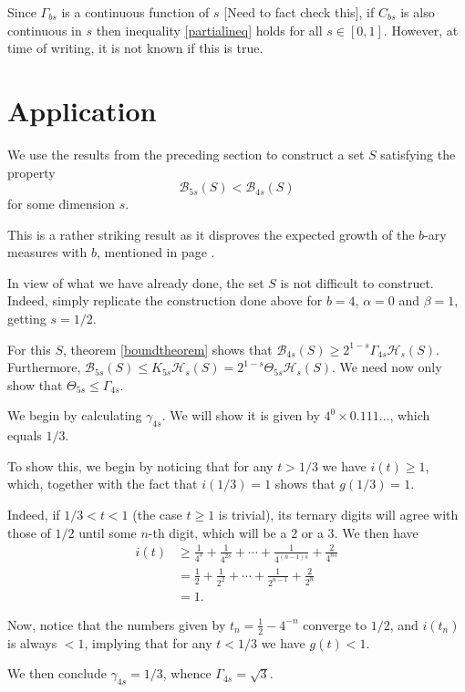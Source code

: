 \documentclass[11pt, reqno]{amsart}
\newcommand{\HH}{\mathcal{H}}
\newcommand{\BB}{\mathcal{B}}
\begin{document}
Since $\Gamma_{bs}$ is a continuous function of $s$ [Need to fact check this], if $C_{bs}$ is also continuous in $s$ then inequality \eqref{partialineq} holds for all $s \in [0,1]$. However, at time of writing, it is not known if this is true.

\section{Application}\label{secfinal}

We use the results from the preceding section to construct a set $S$ satisfying the property
\[ \BB_{5s}(S) < \BB_{4s}(S) \]
for some dimension $s$.

This is a rather striking result as it disproves the expected growth of the $b$-ary measures with $b$, mentioned in page \pageref{falseconjecture}.

In view of what we have already done, the set $S$ is not difficult to construct. Indeed, simply replicate the construction done above for $b = 4$, $\alpha = 0$  and $\beta = 1$, getting $s = 1/2$.

For this $S$, theorem \ref{boundtheorem} shows that $\BB_{4s}(S) \geq 2^{1-s} \Gamma_{4s} \HH_s(S)$. Furthermore, $\BB_{5s}(S) \leq K_{5s} \HH_s(S) = 2^{1-s} \Theta_{5s} \HH_s(S)$. We need now only show that  $\Theta_{5s} \leq \Gamma_{4s}$.

We begin by calculating $\gamma_{4s}$. We will show it is given by $4^0 \times 0.111\dots$, which equals $1/3$.

To show this, we begin by noticing that for any $t > 1/3$ we have $i(t) \geq 1$, which, together with the fact that $i(1/3) = 1$ shows that $g(1/3) = 1$.

Indeed, if $1/3 < t < 1$ (the case $t \geq 1$ is trivial), its ternary digits will agree with those of $1/2$ until some $n$-th digit, which will be a $2$ or a $3$. We then have
\begin{align*}
i(t) &\geq \frac 1 {4^s} + \frac 1 {4^{2s}} + \cdots + \frac 1 {4^{(n-1)s}} + \frac 2 {4^{ns}} \\
&= \frac 1 {2} + \frac 1 {2^2} + \cdots + \frac 1 {2^{n-1}} + \frac 2 {2^n} \\
&= 1.
\end{align*}

Now, notice that the numbers given by $t_n = \frac 1 2 - 4^{-n}$ converge to $1/2$, and $i(t_n)$ is always $< 1$, implying that for any $t < 1/3$ we have $g(t) < 1$.

We then conclude $\gamma_{4s} = 1/3$, whence $\Gamma_{4s} = \sqrt 3$.
\end{document}

